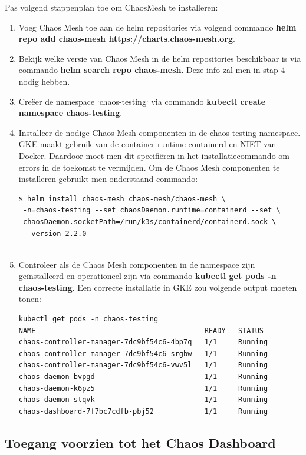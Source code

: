 Pas volgend stappenplan toe om ChaosMesh te installeren:
\begin{enumerate}
    \item Voeg Chaos Mesh toe aan de helm repositories via volgend commando {\bf helm repo add chaos-mesh https://charts.chaos-mesh.org}.
    \item Bekijk welke versie van Chaos Mesh in de helm repositories beschikbaar is via commando {\bf helm search repo chaos-mesh}. Deze info zal men in stap 4 nodig hebben.
    \item Creëer de namespace `chaos-testing` via commando {\bf kubectl create namespace chaos-testing}.
    \item Installeer de nodige Chaos Mesh componenten in de chaos-testing namespace.  GKE maakt gebruik van de container runtime containerd en NIET van Docker. Daardoor moet men dit specifiëren in het installatiecommando om errors in de toekomst te vermijden. Om de Chaos Mesh componenten te installeren gebruikt men onderstaand commando:
\begin{lstlisting}
$ helm install chaos-mesh chaos-mesh/chaos-mesh \
 -n=chaos-testing --set chaosDaemon.runtime=containerd --set \
 chaosDaemon.socketPath=/run/k3s/containerd/containerd.sock \
 --version 2.2.0    
 
\end{lstlisting}

    \item Controleer als de Chaos Mesh componenten in de namespace zijn geïnstalleerd en operationeel zijn via commando {\bf kubectl get pods -n chaos-testing}. Een correcte installatie in GKE zou volgende output moeten tonen: 
\begin{lstlisting}  
kubectl get pods -n chaos-testing
NAME                                        READY   STATUS   
chaos-controller-manager-7dc9bf54c6-4bp7q   1/1     Running
chaos-controller-manager-7dc9bf54c6-srgbw   1/1     Running
chaos-controller-manager-7dc9bf54c6-vwv5l   1/1     Running
chaos-daemon-bvpgd                          1/1     Running
chaos-daemon-k6pz5                          1/1     Running
chaos-daemon-stqvk                          1/1     Running
chaos-dashboard-7f7bc7cdfb-pbj52            1/1     Running   

\end{lstlisting}  
\end{enumerate}

\subsection{Toegang voorzien tot het Chaos Dashboard}
\label{subsec: toegangdashboard}


